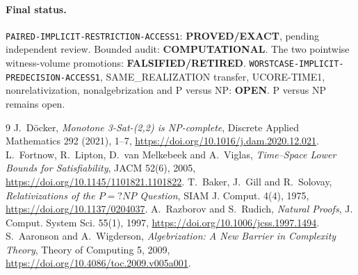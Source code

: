 \documentclass[11pt]{article}
\newcommand{\EXACT}{\textbf{PROVED/EXACT}}
\newcommand{\COMP}{\textbf{COMPUTATIONAL}}
\newcommand{\OPEN}{\textbf{OPEN}}
\newcommand{\RETIRED}{\textbf{FALSIFIED/RETIRED}}
\begin{document}
\paragraph{Final status.}
\texttt{PAIRED-IMPLICIT-RESTRICTION-ACCESS1}: \EXACT, pending independent
review.  Bounded audit: \COMP.  The two pointwise witness-volume promotions:
\RETIRED.  \texttt{WORSTCASE-IMPLICIT-PREDECISION-ACCESS1},
SAME\_REALIZATION transfer, UCORE-TIME1, nonrelativization,
nonalgebrization and P versus NP: \OPEN.  P versus NP remains open.

\begin{thebibliography}{9}
 J.~D\"ocker, \emph{Monotone 3-Sat-(2,2) is NP-complete},
Discrete Applied Mathematics 292 (2021), 1--7,
\url{https://doi.org/10.1016/j.dam.2020.12.021}.
 L.~Fortnow, R.~Lipton, D.~van Melkebeek and A.~Viglas,
\emph{Time--Space Lower Bounds for Satisfiability}, JACM 52(6), 2005,
\url{https://doi.org/10.1145/1101821.1101822}.
 T.~Baker, J.~Gill and R.~Solovay,
\emph{Relativizations of the $P=?NP$ Question}, SIAM J. Comput. 4(4), 1975,
\url{https://doi.org/10.1137/0204037}.
 A.~Razborov and S.~Rudich, \emph{Natural Proofs},
J. Comput. System Sci. 55(1), 1997,
\url{https://doi.org/10.1006/jcss.1997.1494}.
 S.~Aaronson and A.~Wigderson,
\emph{Algebrization: A New Barrier in Complexity Theory},
Theory of Computing 5, 2009,
\url{https://doi.org/10.4086/toc.2009.v005a001}.
\end{thebibliography}

\end{document}
